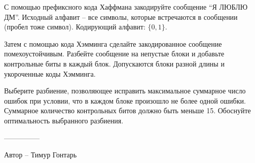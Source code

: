 \question
С помощью префиксного кода Хаффмана закодируйте сообщение “Я ЛЮБЛЮ ДМ”. Исходный алфавит – все символы, которые встречаются в сообщении (пробел тоже символ). Кодирующий алфавит: $\{0, 1\}$.

Затем с помощью кода Хэмминга сделайте закодированное сообщение помехоустойчивым. Разбейте сообщение на непустые блоки и добавьте контрольные биты в каждый блок. Допускаются блоки разной длины и укороченные коды Хэмминга.

Выберите разбиение, позволяющее исправить максимальное суммарное число ошибок при условии, что в каждом блоке произошло не более одной ошибки. Суммарное количество контрольных битов должно быть меньше 15. Обоснуйте оптимальность выбранного разбиения.

---------------

Автор -- Тимур Гонтарь